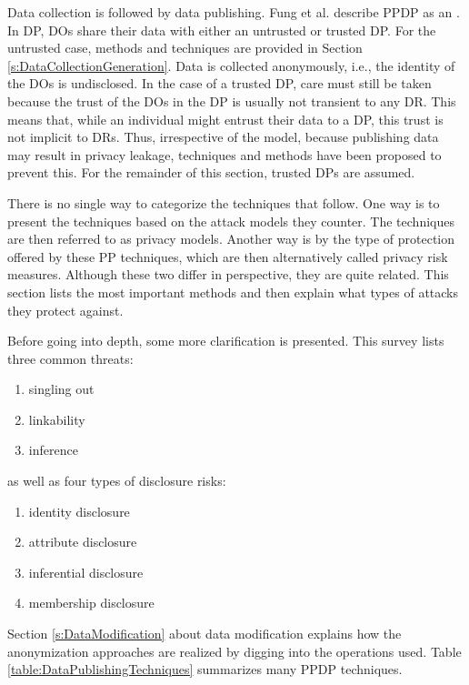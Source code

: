 Data collection is followed by data publishing.
Fung et al. \cite{Fung2010} describe \gls{PPDP} as an . \\
In \gls{DP}, \gls{DO}s share their data with either an untrusted or trusted \gls{DP}.
For the untrusted case, methods and techniques are provided in Section \ref{s:DataCollectionGeneration}.
Data is collected anonymously, i.e., the identity of the \gls{DO}s is undisclosed.
In the case of a trusted \gls{DP}, care must still be taken because the trust of the \gls{DO}s in the \gls{DP} is usually not transient to any \gls{DR}.
This means that, while an individual might entrust their data to a \gls{DP}, this trust is not implicit to \gls{DR}s.
Thus, irrespective of the model, because publishing data may result in privacy leakage, techniques and methods have been proposed to prevent this.
For the remainder of this section, trusted \gls{DP}s are assumed.

There is no single way to categorize the techniques that follow.
One way \cite{Fung2010} is to present the techniques based on the attack models they counter.
The techniques are then referred to as privacy models.
Another way \cite{Lu2021} is by the type of protection offered by these \gls{PP} techniques, which are then alternatively called privacy risk measures.
Although these two differ in perspective, they are quite related.
This section lists the most important methods and then explain what types of attacks they protect against.

Before going into depth, some more clarification is presented.
This survey \cite{Lu2021} lists three common threats:
\begin{enumerate}
    \item singling out
    \item linkability
    \item inference
\end{enumerate}

as well as four types of disclosure risks:
\begin{enumerate}
    \item identity disclosure
    \item attribute disclosure
    \item inferential disclosure
    \item membership disclosure
\end{enumerate}

Section \ref{s:DataModification} about data modification explains how the anonymization approaches are realized by digging into the operations used.
Table \ref{table:DataPublishingTechniques} summarizes many \gls{PPDP} techniques.

